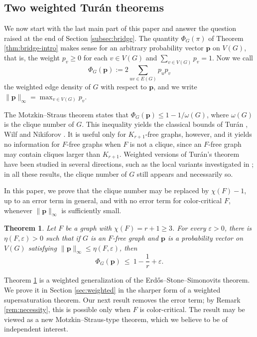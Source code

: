 \documentclass[11pt, a4paper]{article}
\newtheorem{theorem}{Theorem}[section]
\theoremstyle{definition}
\theoremstyle{plain}
\renewcommand{\le}{\leqslant}
\renewcommand{\ge}{\geqslant}
\begin{document}
\subsection{Two weighted Tur\'{a}n theorems}

We now start with the last main part of this paper and
 answer the question raised at the end of Section \ref{subsec:bridge}. 
The quantity $\Phi_G(\pi )$ of Theorem \ref{thm:bridge-intro} makes sense for an
arbitrary probability vector $\bm{p}$ on $V(G)$, 
that is, the weight $p_v \ge 0$ for
each $v\in V(G)$ and $\sum_{v\in V(G)} p_v =1$. Now we call  
\[
  \Phi_G(\bm{p}):=2\sum_{uv\in E(G)}p_up_v 
\]
the weighted edge density of $G$ with respect to $\bm{p}$, and we write
$\lVert \bm{p}\rVert_\infty =\max_{v\in V(G)}p_v$.

The Motzkin--Straus theorem \cite{MS1965} states that
$\Phi_G(\bm{p}) \le 1-1/\omega (G)$, 
where $\omega (G)$ is the clique number of $G$. 
This inequality yields the classical bounds of Tur\'an
\cite{Turan1941}, Wilf \cite{Wilf1986} and Nikiforov \cite{Nik2002}. It is useful only for $K_{r+1}$-free graphs, however, and it yields no information for $F$-free graphs when $F$ is not a clique, since an
$F$-free graph may contain cliques larger than $K_{r+1}$.  
Weighted versions of Tur\'an's theorem have been studied in several directions, such as 
the local variants investigated in \cite{LiuNing2026, LiuNing2025, KKP2025, LSWW2026}; in all these results, the clique number of $G$ still appears and necessarily so. 


In this paper, we prove that the clique number may be replaced by $\chi(F)-1$, up to an error term in general, and with no error term for color-critical $F$, whenever $\lVert \bm{p}\rVert_\infty$ is sufficiently small.  


\begin{theorem}
\label{thm-weighted-ESS}
Let $F$ be a graph with $\chi (F)=r+1\ge 3$. For every $\varepsilon >0$, there is $\eta (F,\varepsilon )>0$ such that if $G$ is an $F$-free graph and
$\bm{p}$ is a probability vector on $V(G)$ satisfying
$\lVert \bm{p}\rVert_\infty\le \eta (F,\varepsilon )$, then
\[  \Phi_G(\bm{p})\ \le \ 1-\frac1r+\varepsilon .\] 
\end{theorem}

Theorem \ref{thm-weighted-ESS} is a weighted generalization of the Erd\H{o}s--Stone--Simonovits theorem. We prove it in Section \ref{sec:weighted}  in the sharper form of a weighted supersaturation theorem. 
Our next result removes the error term;  by Remark \ref{rem:necessity},  this is possible only when $F$ is color-critical. The result may be viewed as a new Motzkin--Straus-type theorem, which we believe to be of independent interest.
\end{document}
